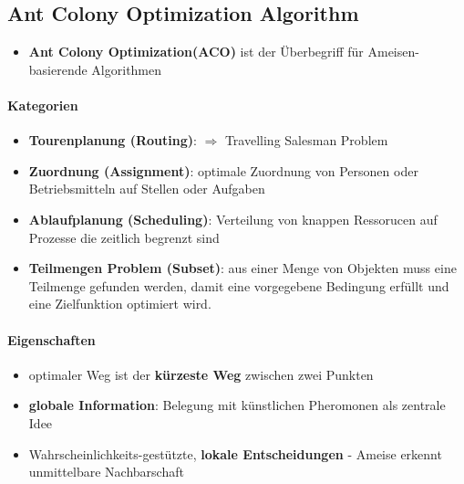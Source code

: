 \subsection{Ant Colony Optimization Algorithm}
\begin{itemize}
	\item \textbf{Ant Colony Optimization(ACO)} ist der Überbegriff für Ameisen-basierende Algorithmen
\end{itemize}
\paragraph{Kategorien}
\begin{itemize}
	\item \textbf{Tourenplanung (Routing)}: $\Rightarrow$ Travelling Salesman Problem
	\item \textbf{Zuordnung (Assignment)}: optimale Zuordnung von Personen oder Betriebsmitteln auf Stellen oder Aufgaben
	\item \textbf{Ablaufplanung (Scheduling)}: Verteilung von knappen Ressorucen auf Prozesse die zeitlich begrenzt sind
	\item \textbf{Teilmengen Problem (Subset)}: aus einer Menge von Objekten muss eine Teilmenge gefunden werden, damit eine vorgegebene Bedingung erfüllt und eine Zielfunktion optimiert wird. 
\end{itemize}
\paragraph{Eigenschaften}
\begin{itemize}
	\item optimaler Weg ist der \textbf{kürzeste Weg} zwischen zwei Punkten
	\item \textbf{globale Information}: Belegung mit künstlichen Pheromonen als zentrale Idee
	\item Wahrscheinlichkeits-gestützte, \textbf{lokale Entscheidungen} - Ameise erkennt unmittelbare Nachbarschaft
\end{itemize}
